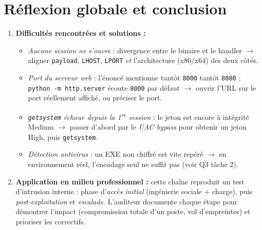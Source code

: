\documentclass[11pt,a4paper]{article}
\begin{document}
\section{Réflexion globale et conclusion}
\begin{enumerate}[leftmargin=1.6em]
  \item \textbf{Difficultés rencontrées et solutions :}
  \begin{itemize}[leftmargin=1.2em]
    \item \emph{Aucune session ne s'ouvre} : divergence entre le binaire et le handler
          $\rightarrow$ aligner \texttt{payload}, \texttt{LHOST}, \texttt{LPORT} \emph{et}
          l'architecture (x86/x64) des deux côtés.
    \item \emph{Port du serveur web} : l'énoncé mentionne tantôt \texttt{8000} tantôt
          \texttt{8080} ; \texttt{python -m http.server} écoute \texttt{8000} par défaut
          $\rightarrow$ ouvrir l'URL sur le port réellement affiché, ou préciser le port.
    \item \emph{\texttt{getsystem} échoue depuis la 1\textsuperscript{re} session} : le jeton
          est encore à intégrité Medium $\rightarrow$ passer d'abord par le \emph{UAC bypass}
          pour obtenir un jeton High, puis \texttt{getsystem}.
    \item \emph{Détection antivirus} : un EXE non chiffré est vite repéré $\rightarrow$ en
          environnement réel, l'encodage seul ne suffit pas (voir Q3 tâche 2).
  \end{itemize}

  \item \textbf{Application en milieu professionnel :} cette chaîne reproduit un test
        d'intrusion interne : phase d'\emph{accès initial} (ingénierie sociale + charge),
        puis \emph{post-exploitation} et \emph{escalade}. L'auditeur documente chaque étape
        pour démontrer l'impact (compromission totale d'un poste, vol d'empreintes) et
        prioriser les correctifs.


\end{enumerate}
\end{document}
